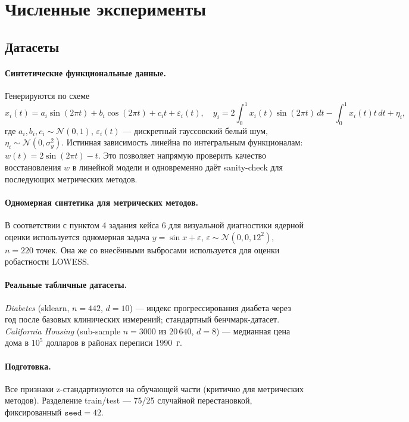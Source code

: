 \documentclass[12pt,a4paper]{article}
\theoremstyle{definition}
\theoremstyle{remark}
\begin{document}
\section{Численные эксперименты}
\label{sec:experiments}

\subsection{Датасеты}

\paragraph{Синтетические функциональные данные.}
Генерируются по схеме
\[
    x_{i}(t)=a_{i}\sin(2\pi t)+b_{i}\cos(2\pi t)+c_{i}t+\varepsilon_{i}(t),
    \quad
    y_{i}=2\!\int_{0}^{1}x_{i}(t)\sin(2\pi t)\,dt-\int_{0}^{1}x_{i}(t)t\,dt+\eta_{i},
\]
где $a_{i},b_{i},c_{i}\sim\mathcal{N}(0,1)$, $\varepsilon_{i}(t)$ ---
дискретный гауссовский белый шум, $\eta_{i}\sim\mathcal{N}(0,\sigma_{y}^{2})$.
Истинная зависимость линейна по интегральным функционалам:
$w(t)=2\sin(2\pi t)-t$. Это позволяет напрямую проверить качество
восстановления $w$ в линейной модели и одновременно даёт sanity-check для
последующих метрических методов.

\paragraph{Одномерная синтетика для метрических методов.}
В соответствии с пунктом 4 задания кейса 6 для визуальной диагностики ядерной
оценки используется одномерная задача $y=\sin x+\varepsilon$,
$\varepsilon\sim\mathcal{N}(0,0{,}12^{2})$, $n=220$ точек. Она же со внесёнными
выбросами используется для оценки робастности LOWESS.

\paragraph{Реальные табличные датасеты.}
\textit{Diabetes} (sklearn, $n=442$, $d=10$) --- индекс прогрессирования
диабета через год после базовых клинических измерений; стандартный
бенчмарк-датасет. \textit{California Housing} (sub-sample $n=3000$ из
$20\,640$, $d=8$) --- медианная цена дома в $10^{5}$ долларов в районах
переписи 1990~г.

\paragraph{Подготовка.} Все признаки z-стандартизуются на обучающей части
(критично для метрических методов). Разделение train/test --- 75/25
случайной перестановкой, фиксированный $\texttt{seed}=42$.
\end{document}
